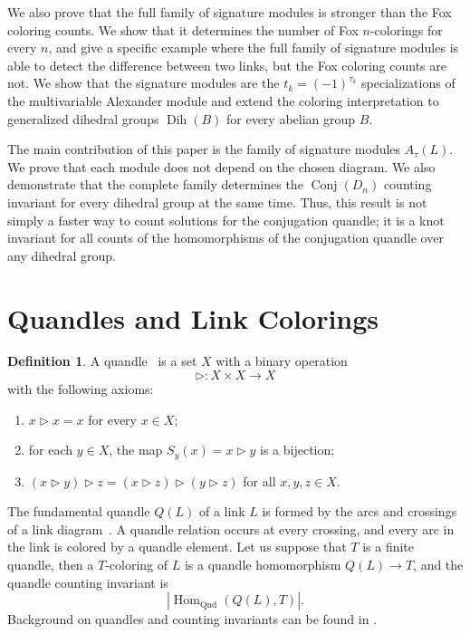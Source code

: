\documentclass[11pt]{article}
\theoremstyle{definition}
\newtheorem{definition}[theorem]{Definition}
\newcommand{\Conj}{\operatorname{Conj}}
\begin{document}
We also prove that the full family of signature modules is
stronger than the Fox coloring counts. We show that it
determines the number of Fox $n$-colorings for every $n$, and
give a specific example where the full family of signature
modules is able to detect the difference between two links,
but the Fox coloring counts are not. We show that the
signature modules are the $t_k=(-1)^{\tau_k}$ specializations
of the multivariable Alexander module and extend the coloring
interpretation to generalized dihedral groups
$\operatorname{Dih}(B)$ for every abelian group $B$.




The main contribution of this paper is the family of signature modules $A_\tau(L)$. We prove that each module does not depend on the chosen diagram. We also demonstrate that the complete family determines the $\Conj(D_n)$ counting invariant for every dihedral group at the same time. Thus, this result is not simply a faster way to count solutions for the conjugation quandle; it is a knot invariant for all counts of the homomorphisms of the conjugation quandle over any dihedral group.

\section{Quandles and Link Colorings}

\begin{definition}
A quandle~\cite[p.~105]{kamada2002} is a set $X$ with a binary operation
\[
\triangleright:X\times X\longrightarrow X
\]
with the following axioms:
\begin{enumerate}
    \item[(i)] $x\triangleright x=x$ for every $x\in X$;
    \item[(ii)] for each $y\in X$, the map $S_y(x)=x\triangleright y$ is a bijection;
    \item[(iii)] $(x\triangleright y)\triangleright z=(x\triangleright z)\triangleright(y\triangleright z)$ for all $x,y,z\in X$.
\end{enumerate}
\end{definition}

The fundamental quandle $Q(L)$ of a link $L$ is formed by the arcs and crossings of a link diagram~\cite[Sections~1--3]{kamada2002}. A quandle relation occurs at every crossing, and every arc in the link is colored by a quandle element. Let us suppose that $T$ is a finite quandle, then a $T$-coloring of $L$ is a quandle homomorphism $Q(L)\to T$, and the quandle counting invariant is
\[
\left|\operatorname{Hom}_{\mathrm{Qnd}}(Q(L),T)\right|.
\]
Background on quandles and counting invariants can be found in \cite[Chapters~3--4]{elhamdadi}.
\end{document}
